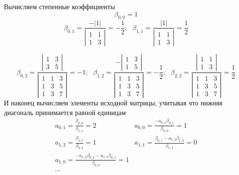 Вычисляем степенные коэффициенты
$$\beta_{0,0}=1$$
$$
\beta_{0,1}=\displaystyle\frac{-\left|1\right|}{ \left|
\begin{array}{cc}
1 & 1\\
1 & 3
\end{array}
\right| }=-\frac{1}{2};\mbox{      }
\beta_{1,1}=\displaystyle\frac{\left|1\right|}{ \left|
\begin{array}{cc}
1 & 1\\
1 & 3
\end{array}
\right| }=\frac{1}{2}
$$

$$
\beta_{0,2}=\displaystyle \frac {\left|\begin{array}{cc}1 & 3\\ 3
& 5
\end{array}\right|} {\left|\begin{array}{ccc}1 & 1 & 3\\ 1 & 3 &
5\\ 1 & 3 & 7  \end{array}\right|}=-1;\mbox{   }
\beta_{1,2}=\displaystyle \frac {-\left|\begin{array}{cc}1 & 3\\ 1
& 5
\end{array}\right|} {\left|\begin{array}{ccc}1 & 1 & 3\\ 1 & 3 &
5\\ 1 & 3 & 7  \end{array}\right|}=-\frac{1}{2}; \mbox{      }
\beta_{2,2}=\displaystyle \frac {\left|\begin{array}{cc}1 & 1\\ 1
& 3
\end{array}\right|} {\left|\begin{array}{ccc}1 & 1 & 3\\ 1 & 3 &
5\\ 1 & 3 & 7  \end{array}\right|}=\frac{1}{2}
$$
И наконец вычисляем элементы исходной матрицы, учитывая что
нижняя диагональ принимается равной единицам
$$
\begin{array} {lllll}
a_{0,1}=\displaystyle\frac{\beta_{0,0}}{\beta_{1,1}}=2 &
a_{0,0}=\displaystyle\frac{-a_{0,1}\beta_{0,1}}{\beta_{0,0}}=1 \\
a_{1,2}=\displaystyle\frac{\beta_{1,1}}{\beta_{2,2}}=1 &
a_{1,1}=\displaystyle\frac{\beta_{0,1}-a_{1,2}\beta_{1,2}}{\beta_{1,1}}=0 \\
a_{1,0}=\displaystyle\frac{-a_{1,2}\beta_{0,2}-a_{1,1}\beta_{0,1}}{\beta_{0,0}}=1 \\
\cdots
\end{array}
$$
